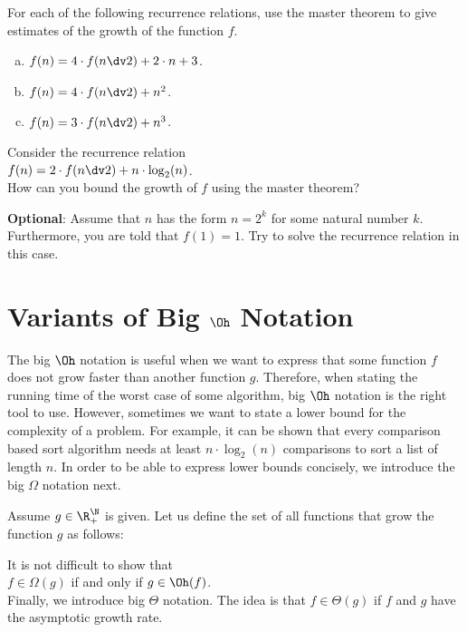 \exercise
For each of the following recurrence relations, use the master theorem to give estimates of the
growth of the function $f$. 
\begin{enumerate}[(a)]
\item $f(n) = 4 \cdot f(n \dv 2) + 2 \cdot n + 3$.
\item $f(n) = 4 \cdot f(n \dv 2) + n^2$.
\item $f(n) = 3 \cdot f(n \dv 2) + n^3$.  \eox
\end{enumerate}
\pagebreak

\exercise
Consider the recurrence relation
\\[0.2cm]
\hspace*{1.3cm}
$f(n) = 2 \cdot f(n \dv 2) + n \cdot \log_2(n)$.
\\[0.2cm] 
How can you bound the growth of $f$ using the master theorem? 
\vspace*{0.1cm}

\noindent
\textbf{Optional}: Assume that $n$ has the form $n = 2^k$ for some natural number $k$.
Furthermore, you are told that $f(1) = 1$.  Try to solve the recurrence relation in this case.
\eox

\section{Variants of Big $\Oh$ Notation}
The big $\Oh$ notation is useful when we want to express that some function $f$ does not grow faster
than another function $g$.  Therefore, when stating the running time of the worst case of some algorithm,
big $\Oh$ notation is the right tool to use.  However, sometimes we want to state a lower bound for
the complexity of a problem.  For example, it can be shown that every comparison based sort algorithm needs at least
$n \cdot \log_2(n)$ comparisons to sort a list of length $n$.  In order to be able to express lower
bounds concisely, we introduce the big $\Omega$ notation next.

\begin{Definition}[$\Omega(g)$] 
  Assume $g \in \R_+^{\N}$ is given.   Let us define the set of all functions that grow 
   the function $g$ as follows:
  \\[0.2cm]
  \hspace*{0.5cm} 
  \colorbox{red}{}
  \eox
\end{Definition}
It is not difficult to show that
\\[0.2cm]
\hspace*{1.3cm}
 $f \in \Omega(g)$ \quad if and only if \quad $g \in \Oh(f)$.
\\[0.2cm]
Finally, we introduce big $\Theta$ notation.  The idea is that $f \in \Theta(g)$ if 
$f$ and $g$ have the  asymptotic growth rate. 

